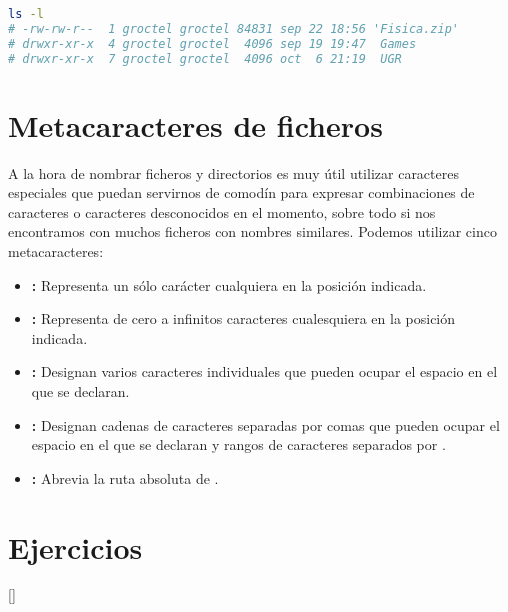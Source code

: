 \begin{lstlisting}[language=sh]
ls -l
# -rw-rw-r--  1 groctel groctel 84831 sep 22 18:56 'Fisica.zip'
# drwxr-xr-x  4 groctel groctel  4096 sep 19 19:47  Games
# drwxr-xr-x  7 groctel groctel  4096 oct  6 21:19  UGR
\end{lstlisting}

\section{Metacaracteres de ficheros}

A la hora de nombrar ficheros y directorios es muy útil utilizar caracteres especiales que puedan servirnos de comodín para expresar combinaciones de caracteres o caracteres desconocidos en el momento, sobre todo si nos encontramos con muchos ficheros con nombres similares.
Podemos utilizar cinco metacaracteres:

\begin{itemize}
\item{}\textbf{:} Representa un sólo carácter cualquiera en la posición indicada.
\item\code{*}\textbf{:} Representa de cero a infinitos caracteres cualesquiera en la posición indicada.
\item\code{[]}\textbf{:} Designan varios caracteres individuales que pueden ocupar el espacio en el que se declaran.
\item\code{\{\}}\textbf{:} Designan cadenas de caracteres separadas por comas que pueden ocupar el espacio en el que se declaran y rangos de caracteres separados por .
\item\code{\~{}}\textbf{:} Abrevia la ruta absoluta de .
\end{itemize}

\section{Ejercicios}

[]

\subsection{}\label{ej1-1}

